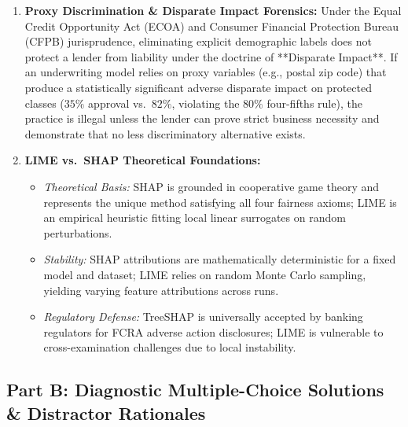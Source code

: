 \begin{enumerate}[label=\textbf{P12.\arabic*}]
    \item \textbf{Proxy Discrimination \& Disparate Impact Forensics:}
    Under the Equal Credit Opportunity Act (ECOA) and Consumer Financial Protection Bureau (CFPB) jurisprudence, eliminating explicit demographic labels does not protect a lender from liability under the doctrine of **Disparate Impact**. If an underwriting model relies on proxy variables (e.g., postal zip code) that produce a statistically significant adverse disparate impact on protected classes ($35\%$ approval vs.~$82\%$, violating the $80\%$ four-fifths rule), the practice is illegal unless the lender can prove strict business necessity and demonstrate that no less discriminatory alternative exists.

    \item \textbf{LIME vs.~SHAP Theoretical Foundations:}
    \begin{itemize}
        \item \textit{Theoretical Basis:} SHAP is grounded in cooperative game theory and represents the unique method satisfying all four fairness axioms; LIME is an empirical heuristic fitting local linear surrogates on random perturbations.
        \item \textit{Stability:} SHAP attributions are mathematically deterministic for a fixed model and dataset; LIME relies on random Monte Carlo sampling, yielding varying feature attributions across runs.
        \item \textit{Regulatory Defense:} TreeSHAP is universally accepted by banking regulators for FCRA adverse action disclosures; LIME is vulnerable to cross-examination challenges due to local instability.
    \end{itemize}
\end{enumerate}

\subsection*{Part B: Diagnostic Multiple-Choice Solutions \& Distractor Rationales}

